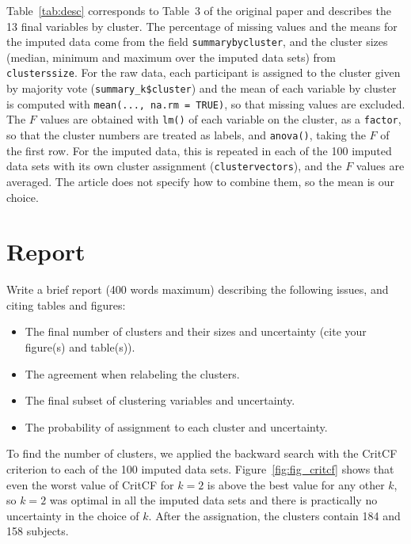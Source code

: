 \documentclass[a4paper,10pt]{article}\usepackage[]{graphicx}\usepackage[]{xcolor}
\begin{document}
Table~\ref{tab:desc} corresponds to Table~3 of the original paper and describes the 13 final variables by cluster. The percentage of missing values and the means for the imputed data come from the field \texttt{summarybycluster}, and the cluster sizes (median, minimum and maximum over the imputed data sets) from \texttt{clusterssize}. For the raw data, each participant is assigned to the cluster given by majority vote (\texttt{summary\_k\$cluster}) and the mean of each variable by cluster is computed with \texttt{mean(..., na.rm = TRUE)}, so that missing values are excluded. The $F$ values are obtained with \texttt{lm()} of each variable on the cluster, as a \texttt{factor}, so that the cluster numbers are treated as labels, and \texttt{anova()}, taking the $F$ of the first row. For the imputed data, this is repeated in each of the 100 imputed data sets with its own cluster assignment (\texttt{clustervectors}), and the $F$ values are averaged. The article does not specify how to combine them, so the mean is our choice.


\section{Report}

Write a brief report (400 words maximum) describing the following issues, and citing tables and figures:
  
  \begin{itemize}
\item The final number of clusters and their sizes and uncertainty (cite your figure(s) and table(s)).

\item The agreement when relabeling the clusters.

\item The final subset of clustering variables and uncertainty.

\item The probability of assignment to each cluster and uncertainty.
\end{itemize}


  

  
To find the number of clusters, we applied the backward search with the CritCF criterion to each of the 100 imputed data sets.
Figure~\ref{fig:fig_critcf} shows that even the worst value of CritCF for $k=2$ is above the best value for any other $k$, so $k=2$ was optimal in all the imputed data sets and there is practically no uncertainty in the choice of $k$. After the assignation, the clusters contain 184 and 158 subjects.
\end{document}
